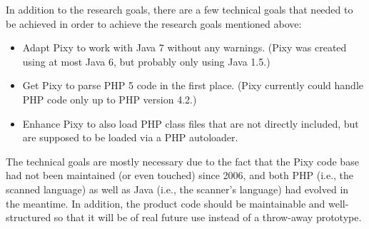 In addition to the research goals, there are a few technical goals that needed to be achieved in order to achieve the research goals mentioned above:

\begin{itemize}
 \item Adapt Pixy to work with Java 7 without any warnings. (Pixy was created using at most Java 6, but probably only using Java 1.5.)
 \item Get Pixy to parse PHP 5 code in the first place. (Pixy currently could handle PHP code only up to PHP version 4.2.)
 \item Enhance Pixy to also load PHP class files that are not directly included, but are supposed to be loaded via a PHP autoloader.
\end{itemize}

The technical goals are mostly necessary due to the fact that the Pixy code base had not been maintained (or even touched) since 2006, and both PHP (i.e., the scanned language) as well as Java (i.e., the scanner's language) had evolved in the meantime. In addition, the product code should be maintainable and well-structured so that it will be of real future use instead of a throw-away prototype.
